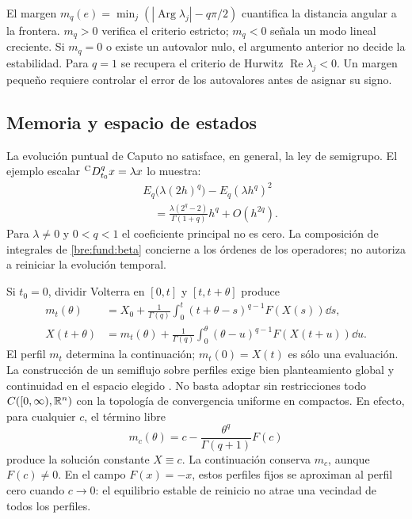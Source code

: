 El margen $m_q(e)=\min_j(|\operatorname{Arg}\lambda_j|-q\pi/2)$
cuantifica la distancia angular a la frontera. $m_q>0$ verifica el criterio
estricto; $m_q<0$ señala un modo lineal creciente. Si $m_q=0$ o existe un
autovalor nulo, el argumento anterior no decide la estabilidad. Para $q=1$
se recupera el criterio de Hurwitz $\operatorname{Re}\lambda_j<0$.
Un margen pequeño requiere controlar el error de los autovalores antes
de asignar su signo.

\subsection{Memoria y espacio de estados}

La evolución puntual de Caputo no satisface, en general, la ley de
semigrupo. El ejemplo escalar ${}^{\mathrm C}D_{t_0}^{q} x=\lambda x$ lo muestra:
\begin{align}
 &E_q\bigl(\lambda(2h)^q\bigr)-E_q(\lambda h^q)^2\nonumber\\
 &\quad=\frac{\lambda(2^q-2)}{\Gamma(1+q)}h^q+O(h^{2q}).
 \label{bre:fund:nosemigroup}
\end{align}
Para $\lambda\ne0$ y $0<q<1$ el coeficiente principal no es cero.
La composición de integrales de \eqref{bre:fund:beta} concierne a los
órdenes de los operadores; no autoriza a reiniciar la evolución temporal.

Si $t_0=0$, dividir Volterra en $[0,t]$ y $[t,t+\theta]$ produce
\begin{align}
 m_t(\theta)&=X_0+\frac1{\Gamma(q)}
  \int_0^t(t+\theta-s)^{q-1}F(X(s))\dd s,\nonumber\\
 X(t+\theta)&=m_t(\theta)+\frac1{\Gamma(q)}
  \int_0^\theta(\theta-u)^{q-1}F(X(t+u))\dd u.
 \label{bre:fund:profile}
\end{align}
El perfil $m_t$ determina la continuación; $m_t(0)=X(t)$ es sólo una
evaluación. La construcción de un semiflujo sobre perfiles exige
bien planteamiento global y continuidad en el espacio elegido
\cite{DoanKloeden2021Semidynamical}. No basta adoptar sin restricciones
todo $C([0,\infty),\mathbb R^n)$ con la topología de convergencia uniforme en
compactos. En efecto, para cualquier $c$, el término libre
\begin{equation}
 m_c(\theta)=c-\frac{\theta^q}{\Gamma(q+1)}F(c)
 \label{bre:fund:artificial}
\end{equation}
produce la solución constante $X\equiv c$. La continuación conserva
$m_c$, aunque $F(c)\ne0$. En el campo $F(x)=-x$, estos perfiles fijos
se aproximan al perfil cero cuando $c\to0$: el equilibrio estable de
reinicio no atrae una vecindad de todos los perfiles.

